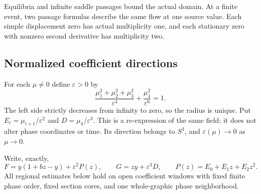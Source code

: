 Equilibria and infinite saddle passages bound the actual domain.
At a finite event, two passage formulas describe the same flow at one
source value. Each simple displacement zero has actual multiplicity one,
and each stationary zero with nonzero second derivative has multiplicity two.

\subsection{Normalized coefficient directions}
For each $\mu\ne0$ define $\varepsilon>0$ by
\begin{equation}\label{eq:weighted-radius-main}
 \frac{\mu_1^2+\mu_2^2+\mu_3^2}{\varepsilon^4}
                  +\frac{\mu_4^2}{\varepsilon^6}=1 .
\end{equation}
The left side strictly decreases from infinity to zero, so the
radius is unique. Put $E_i=\mu_{i+1}/\varepsilon^2$ and
$D=\mu_4/\varepsilon^3$. This is a re-expression of the same field;
it does not alter phase coordinates or time. Its direction belongs
to $S^3$, and $\varepsilon(\mu)\to0$ as $\mu\to0$.

Write, exactly,
\begin{equation}\label{eq:upper-normalized}
 F=y(1+bz-y)+\varepsilon^2P(z),\qquad
 G=zy+\varepsilon^3D,\qquad
 P(z)=E_0+E_1z+E_2z^2 .
\end{equation}
All regional estimates below hold on open coefficient windows with
fixed finite phase order, fixed section cores, and one whole-graphic
phase neighborhood.

